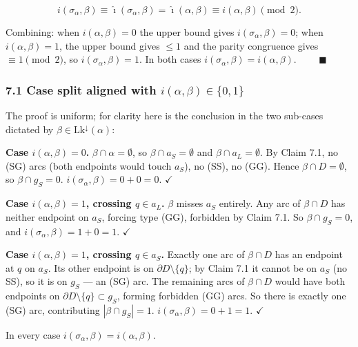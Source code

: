 \documentclass[
]{article}
\begin{document}
\[
i(\sigma_\alpha, \beta) \equiv \hat\imath(\sigma_\alpha, \beta) = \hat\imath(\alpha, \beta) \equiv i(\alpha, \beta) \pmod 2.
\]

Combining: when \(i(\alpha, \beta) = 0\) the upper bound gives
\(i(\sigma_\alpha, \beta) = 0\); when \(i(\alpha, \beta) = 1\), the
upper bound gives \(\le 1\) and the parity congruence gives
\(\equiv 1 \pmod 2\), so \(i(\sigma_\alpha, \beta) = 1\). In both cases
\(i(\sigma_\alpha, \beta) = i(\alpha, \beta)\). \(\qquad\blacksquare\)

\subsubsection{\texorpdfstring{7.1 Case split aligned with
\(i(\alpha, \beta) \in \{0, 1\}\)}{7.1 Case split aligned with i(\textbackslash alpha, \textbackslash beta) \textbackslash in \textbackslash\{0, 1\textbackslash\}}}\label{case-split-aligned-with-ialpha-beta-in-0-1}

The proof is uniform; for clarity here is the conclusion in the two
sub-cases dictated by \(\beta \in \mathrm{Lk}^\downarrow(\alpha)\):

\textbf{Case \(i(\alpha, \beta) = 0\).}
\(\beta \cap \alpha = \emptyset\), so \(\beta \cap a_S = \emptyset\) and
\(\beta \cap a_L = \emptyset\). By Claim 7.1, no (SG) arcs (both
endpoints would touch \(a_S\)), no (SS), no (GG). Hence
\(\beta \cap D = \emptyset\), so \(\beta \cap g_S = 0\).
\(i(\sigma_\alpha, \beta) = 0 + 0 = 0\). \(\checkmark\)

\textbf{Case \(i(\alpha, \beta) = 1\), crossing \(q \in a_L\).}
\(\beta\) misses \(a_S\) entirely. Any arc of \(\beta \cap D\) has
neither endpoint on \(a_S\), forcing type (GG), forbidden by Claim 7.1.
So \(\beta \cap g_S = 0\), and \(i(\sigma_\alpha, \beta) = 1 + 0 = 1\).
\(\checkmark\)

\textbf{Case \(i(\alpha, \beta) = 1\), crossing \(q \in a_S\).} Exactly
one arc of \(\beta \cap D\) has an endpoint at \(q\) on \(a_S\). Its
other endpoint is on \(\partial D \setminus \{q\}\); by Claim 7.1 it
cannot be on \(a_S\) (no SS), so it is on \(g_S\) --- an (SG) arc. The
remaining arcs of \(\beta \cap D\) would have both endpoints on
\(\partial D \setminus \{q\} \subset g_S\), forming forbidden (GG) arcs.
So there is exactly one (SG) arc, contributing \(|\beta \cap g_S| = 1\).
\(i(\sigma_\alpha, \beta) = 0 + 1 = 1\). \(\checkmark\)

In every case \(i(\sigma_\alpha, \beta) = i(\alpha, \beta)\).
\end{document}

